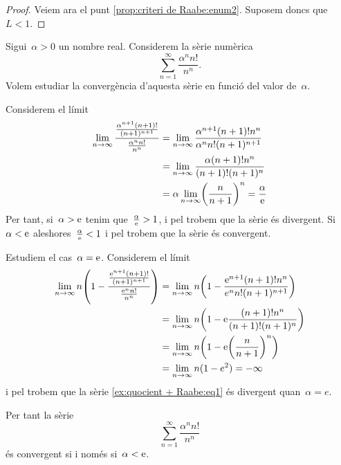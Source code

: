 \documentclass[../../main.tex]{subfiles}
\begin{document}
\begin{proposition}
\begin{proof}
            Veiem ara el punt \eqref{prop:criteri de Raabe:enum2}.
            Suposem doncs que~\(L<1\).
        \end{proof}
    \end{proposition}
    \begin{example}
        \label{ex:quocient + Raabe}
        Sigui~\(\alpha>0\) un nombre real.
        Considerem la sèrie numèrica
        \begin{equation}
            \label{ex:quocient + Raabe:eq1}
            \sum_{n=1}^{\infty}\frac{\alpha^{n}n!}{n^{n}}.
        \end{equation}
        Volem estudiar la convergència d'aquesta sèrie en funció del valor de~\(\alpha\).
        \begin{solution}
            Considerem el límit
            \begin{align*}
                \lim_{n\to\infty}\frac{\frac{\alpha^{n+1}(n+1)!}{(n+1)^{n+1}}}{\frac{\alpha^{n}n!}{n^{n}}}&=\lim_{n\to\infty}\frac{\alpha^{n+1}(n+1)!n^{n}}{\alpha^{n}n!(n+1)^{n+1}} \\
                &=\lim_{n\to\infty}\frac{\alpha(n+1)!n^{n}}{(n+1)!(n+1)^{n}} \\
                &=\alpha\lim_{n\to\infty}\left(\frac{n}{n+1}\right)^{n}=\frac{\alpha}{\e} %
            \end{align*}
            Per tant, si~\(\alpha>\mathrm{e}\) tenim que~\(\frac{\alpha}{\mathrm{e}}>1\), i pel  trobem que la sèrie és divergent.
            Si~\(\alpha<\mathrm{e}\) aleshores~\(\frac{\alpha}{\mathrm{e}}<1\) i pel  trobem que la sèrie és convergent.

            Estudiem el cas~\(\alpha=\mathrm{e}\).
            Considerem el límit
            \begin{align*}
                \lim_{n\to\infty}n\left(1-\frac{\frac{\e^{n+1}(n+1)!}{(n+1)^{n+1}}}{\frac{\e^{n}n!}{n^{n}}}\right)&=\lim_{n\to\infty}n\left(1-\frac{\e^{n+1}(n+1)!n^{n}}{e^{n}n!(n+1)^{n+1}}\right) \\
                &=\lim_{n\to\infty}n\left(1-\e\frac{(n+1)!n^{n}}{(n+1)!(n+1)^{n}}\right) \\
                &=\lim_{n\to\infty}n\left(1-\e\left(\frac{n}{n+1}\right)^{n}\right) \\
                &=\lim_{n\to\infty}n(1-e^{2})=-\infty %
            \end{align*}
            i pel  trobem que la sèrie \eqref{ex:quocient + Raabe:eq1} és divergent quan~\(\alpha=e\).

            Per tant la sèrie
            \[
                \sum_{n=1}^{\infty}\frac{\alpha^{n}n!}{n^{n}}
            \]
            és convergent si i només si~\(\alpha<\mathrm{e}\).
        \end{solution}
    \end{example}
\end{document}
